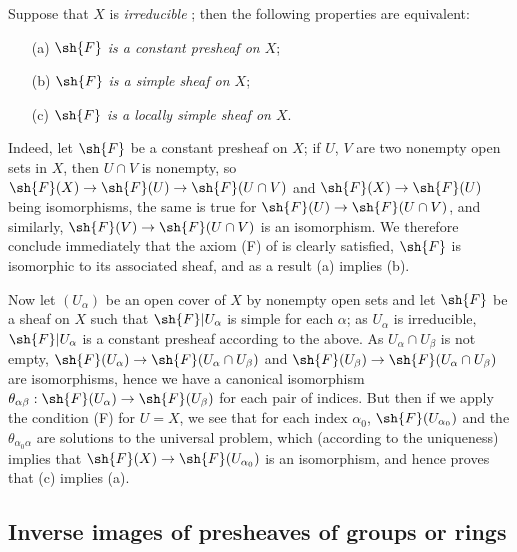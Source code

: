 \begin{env}[3.6.2]
\label{0.3.6.2}
Suppose that $X$ is \emph{irreducible} ; then the following
properties are equivalent:
\begin{enumerate}
  \item[(a)] \emph{$\sh{F}$ is a constant presheaf on $X$};
  \item[(b)] \emph{$\sh{F}$ is a simple sheaf on $X$};
  \item[(c)] \emph{$\sh{F}$ is a locally simple sheaf on $X$}.
\end{enumerate}

Indeed, let $\sh{F}$ be a constant presheaf on $X$; if $U$, $V$ are two nonempty
open sets in $X$, then $U\cap V$ is nonempty, so
$\sh{F}(X)\to\sh{F}(U)\to\sh{F}(U\cap V)$ and $\sh{F}(X)\to\sh{F}(U)$ being
isomorphisms, the same is true for $\sh{F}(U)\to\sh{F}(U\cap V)$, and
similarly, $\sh{F}(V)\to\sh{F}(U\cap V)$ is an isomorphism. We therefore conclude
immediately that the axiom (F) of  is clearly satisfied,
$\sh{F}$ is isomorphic to its associated sheaf, and as a result (a) implies (b).

Now let $(U_\alpha)$ be an open cover of $X$ by nonempty open sets and let
$\sh{F}$ be a sheaf on $X$ such that $\sh{F}|U_\alpha$ is simple for each
$\alpha$; as $U_\alpha$ is irreducible, $\sh{F}|U_\alpha$ is a constant presheaf
according to the above. As $U_\alpha\cap U_\beta$ is not empty,
$\sh{F}(U_\alpha)\to\sh{F}(U_\alpha\cap U_\beta)$ and
$\sh{F}(U_\beta)\to\sh{F}(U_\alpha\cap U_\beta)$ are isomorphisms, hence we have
a canonical isomorphism
$\theta_{\alpha\beta}:\sh{F}(U_\alpha)\to\sh{F}(U_\beta)$ for each pair of
indices. But then if we apply the condition (F) for $U=X$, we see that for each
index $\alpha_0$, $\sh{F}(U_{\alpha_0})$ and the $\theta_{\alpha_0\alpha}$ are
solutions to the universal problem, which (according to the uniqueness) implies
that $\sh{F}(X)\to\sh{F}(U_{\alpha_0})$ is an isomorphism, and hence proves that
(c) implies (a).
\end{env}

\subsection{Inverse images of presheaves of groups or rings}
\label{subsection:0.3.7}

